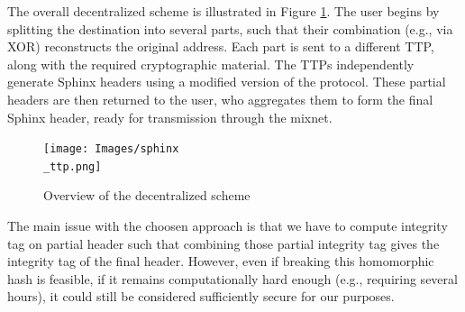 The overall decentralized scheme is illustrated in Figure \ref{fig:overall_schema}. 
The user begins by splitting the destination into several parts, such that their combination (e.g., via XOR) reconstructs the original address. 
Each part is sent to a different TTP, along with the required cryptographic material. 
The TTPs independently generate Sphinx headers using a modified version of the protocol.  
These partial headers are then returned to the user, who aggregates them to form the final Sphinx header, ready for transmission through the mixnet.
\begin{figure}[H]
    \centering
    \texttt{[image: Images/sphinx\\\_ttp.png]}
    \caption{Overview of the decentralized scheme}
    \label{fig:overall_schema}
\end{figure}


The main issue with the choosen approach is that we have to compute integrity tag on partial header such 
that combining those partial integrity tag gives the integrity tag of the final header.
However, even if breaking this homomorphic hash is feasible, if it remains computationally hard enough (e.g., requiring several hours), it could still be considered sufficiently secure for our purposes.



